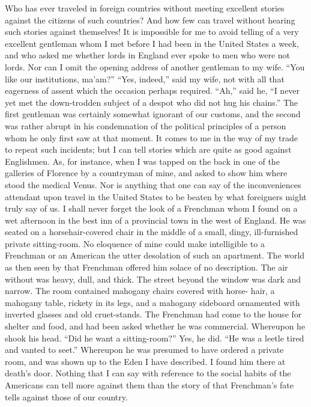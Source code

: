 Who has ever traveled in foreign countries without meeting
excellent stories against the citizens of such countries?  And how
few can travel without hearing such stories against themselves!  It
is impossible for me to avoid telling of a very excellent gentleman
whom I met before I had been in the United States a week, and who
asked me whether lords in England ever spoke to men who were not
lords.  Nor can I omit the opening address of another gentleman to
my wife.  ``You like our institutions, ma'am?''  ``Yes, indeed,'' said
my wife, not with all that eagerness of assent which the occasion
perhaps required.  ``Ah,'' said he, ``I never yet met the down-trodden
subject of a despot who did not hug his chains.''  The first
gentleman was certainly somewhat ignorant of our customs, and the
second was rather abrupt in his condemnation of the political
principles of a person whom he only first saw at that moment.  It
comes to me in the way of my trade to repeat such incidents; but I
can tell stories which are quite as good against Englishmen.  As,
for instance, when I was tapped on the back in one of the galleries
of Florence by a countryman of mine, and asked to show him where
stood the medical Venus.  Nor is anything that one can say of the
inconveniences attendant upon travel in the United States to be
beaten by what foreigners might truly say of us.  I shall never
forget the look of a Frenchman whom I found on a wet afternoon in
the best inn of a provincial town in the west of England.  He was
seated on a horsehair-covered chair in the middle of a small,
dingy, ill-furnished private sitting-room.  No eloquence of mine
could make intelligible to a Frenchman or an American the utter
desolation of such an apartment.  The world as then seen by that
Frenchman offered him solace of no description.  The air without
was heavy, dull, and thick.  The street beyond the window was dark
and narrow.  The room contained mahogany chairs covered with horse-
hair, a mahogany table, rickety in its legs, and a mahogany
sideboard ornamented with inverted glasses and old cruet-stands.
The Frenchman had come to the house for shelter and food, and had
been asked whether he was commercial.  Whereupon he shook his head.
``Did he want a sitting-room?''  Yes, he did.  ``He was a leetle tired
and vanted to seet.''  Whereupon he was presumed to have ordered a
private room, and was shown up to the Eden I have described.  I
found him there at death's door.  Nothing that I can say with
reference to the social habits of the Americans can tell more
against them than the story of that Frenchman's fate tells against
those of our country.


